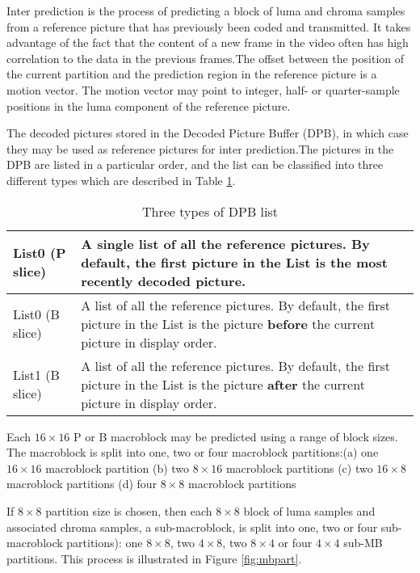 \documentclass[../main.tex]{subfiles}
\begin{document}
Inter prediction is the process of predicting
a block of luma and chroma samples from a reference picture that has
previously been coded and transmitted. It
takes advantage of the fact that the content of a new frame in
the video often has high correlation to the data in the
previous frames.The offset between the position of the current partition and the prediction
region in the reference picture is a motion vector. The motion vector may point to integer,
half- or quarter-sample positions in the luma component of the reference picture. 

The decoded pictures stored in the Decoded
Picture Buffer (DPB), in which case they may be used as
reference pictures for inter prediction.The pictures in the DPB are listed in a particular order, and
the list can be classified into three different types which are described in Table \ref{tab:dpb}.

\begin{table}[ht]
\label{tab:dpb}
\begin{center}       
\begin{tabular}{|l|p{10cm}|} 
\hline
\rule[-1ex]{0pt}{3.5ex}  List0 (P slice) & A single list of all the reference pictures.  By default, the first picture in
the List is the most recently decoded picture.\\  
\hline
\rule[-1ex]{0pt}{3.5ex}  List0 (B slice) & A list of all the reference pictures. By default, the first picture in the List
is the picture \textbf {before} the current picture in display order.   \\
\hline
\rule[-1ex]{0pt}{3.5ex}  List1 (B slice) & A list of all the reference pictures. By default, the first picture in the List
is the picture \textbf {after} the current picture in display order.  \\
\hline

\end{tabular}
\end{center}
\caption{Three types of DPB list} 
\end{table}

Each $16 \times 16$ P or B macroblock may be predicted using a range
of block sizes. The macroblock is split into one, two or four
macroblock partitions:(a) one $16 \times 16$ macroblock partition (b) two $8 \times 16$ macroblock partitions
(c) two $16 \times 8$ macroblock partitions (d) four $8 \times 8$ macroblock partitions

If $8 \times 8$ partition size is chosen, then each $8 \times 8$ block of luma samples and associated chroma
samples, a sub-macroblock, is split into one, two or four sub-macroblock partitions): one
$8 \times 8$, two $4 \times 8$, two $8 \times 4$ or four $4 \times 4$ sub-MB partitions. This process is illustrated in Figure \ref{fig:mbpart}.
\end{document}
